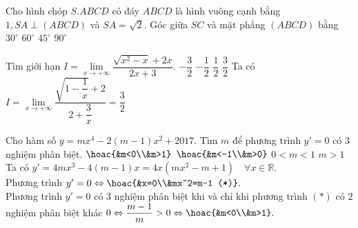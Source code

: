 \begin{ex}%
	Cho hình chóp $S.ABCD$ có đáy $ABCD$ là hình vuông cạnh bằng $1, SA \perp (ABCD)$ và $SA=\sqrt{2}$. Góc giữa $SC$ và mặt phẳng $(ABCD)$ bằng 
	\choice
	{$30^ \circ$}
	{ $60^ \circ$}
	{\True $ 45^\circ$}
	{$90^ \circ$}
\end{ex}

\begin{ex}%
	Tìm giới hạn $I= \lim\limits_{x \rightarrow + \infty} \dfrac{\sqrt{x^2-x}+2x}{2x+3}.$
	\choice
	{$-\dfrac{3}{2}$}
	{$-\dfrac{1}{2}$}
	{$\dfrac{1}{2}$}
	{\True$\dfrac{3}{2}$}
	\loigiai
	{Ta có $I= \lim\limits_{x \rightarrow + \infty} \dfrac{\sqrt{1-\dfrac{1}{x}}+2}{2+\dfrac{3}{x}} = \dfrac{3}{2}$
	}
\end{ex}

\begin{ex}%
	Cho hàm số $y=mx^4-2(m-1)x^2+2017$. Tìm $m$ để phương trình $y'=0$ có $3$ nghiệm phân biệt.
	\choice
	{\True $\hoac{&m<0\\&m>1}$}
	{$\hoac{&m<-1\\&m>0}$}
	{$0<m<1$}
	{$m>1$}
	\loigiai
	{ Ta có $y'=4mx^3-4(m-1)x = 4x(mx^2-m+1) \quad \forall x \in \mathbb{R}.$\\
		Phương trình $y'=0 \Leftrightarrow \hoac{&x=0\\&mx^2=m-1 (*)}.$\\
		Phương trình $y'=0$ có $3$ nghiệm phân biệt khi và chỉ khi phương trình $(*)$ có $2$ nghiệm phân biệt khác $0 \Leftrightarrow \dfrac{m-1}{m}>0 \Leftrightarrow \hoac{&m<0\\&m>1}.$
	}
\end{ex}

